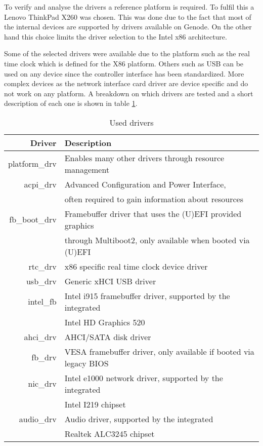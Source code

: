 \documentclass[
a4paper,
12pt,
notitlepage,
parskip=half,
DIV=11,
]{scrbook}
\begin{document}
		To verify and analyse the drivers a reference platform is required.
		To fulfil this a Lenovo ThinkPad X260 was chosen.
		This was done due to the fact that most of the internal devices are supported by drivers available on Genode.
		On the other hand this choice limits the driver selection to the Intel x86 architecture.
		
		Some of the selected drivers were available due to the platform such as the real time clock which is defined for the X86 platform.
		Others such as USB can be used on any device since the controller interface has been standardized.
		More complex devices as the network interface card driver are device specific and do not work on any platform.
		A breakdown on which drivers are tested and a short description of each one is shown in table \ref{driver_selection}.
		
		\begin{table}[]
			\centering
			\begin{tabular}{r|l}
				Driver        & 
				Description 
				\\ \hline
				platform\_drv & 
				Enables many other drivers through resource management
				\\ \hline
				acpi\_drv     &
				Advanced Configuration and Power Interface,
				\\& often required to gain information about resources \citep{acpi_spec}
				\\ \hline
				fb\_boot\_drv &
				Framebuffer driver that uses the (U)EFI provided graphics
				\\& through Multiboot2, only available when booted via (U)EFI  \citep{multiboot2}
				\\ \hline
				rtc\_drv      &
				x86 specific real time clock device driver
				\\ \hline
				usb\_drv      &
				Generic xHCI USB driver \citep{xhci}
				\\ \hline
				intel\_fb     &
				Intel i915 framebuffer driver, supported by the integrated
				\\& Intel HD Graphics 520 \citep{x260}
				\\ \hline
				ahci\_drv     &
				AHCI/SATA disk driver
				\\ \hline
				fb\_drv       &
				VESA framebuffer driver, only available if booted via legacy BIOS
				\\ \hline
				nic\_drv      &
				Intel e1000 network driver, supported by the integrated
				\\& Intel I219 chipset \citep{x260}
				\\  \hline
				audio\_drv    &
				Audio driver, supported by the integrated
				\\& Realtek ALC3245 chipset \citep{x260}
			\end{tabular}
			\caption{Used drivers}
			\label{driver_selection}
		\end{table}
		
\end{document}
